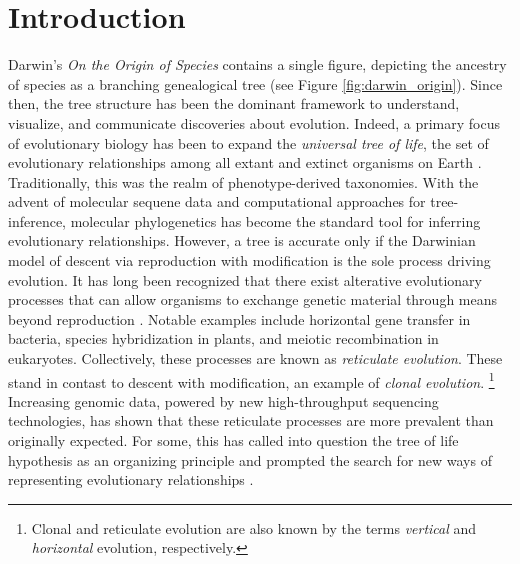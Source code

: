 \chapter{Introduction}
\label{ch:introduction}


Darwin's \emph{On the Origin of Species} contains a single figure, depicting the ancestry of species as a branching genealogical tree \cite{Darwin:1859uh} (see Figure \ref{fig:darwin_origin}).
Since then, the tree structure has been the dominant framework to understand, visualize, and communicate discoveries about evolution.
Indeed, a primary focus of evolutionary biology has been to expand the \emph{universal tree of life}, the set of evolutionary relationships among all extant and extinct organisms on Earth \cite{Bowler:2003uz}.
Traditionally, this was the realm of phenotype-derived taxonomies.
With the advent of molecular sequene data and computational approaches for tree-inference, molecular phylogenetics has become the standard tool for inferring evolutionary relationships.
However, a tree is accurate only if the Darwinian model of descent via reproduction with modification is the sole process driving evolution.
It has long been recognized that there exist alterative evolutionary processes that can allow organisms to exchange genetic material through means beyond reproduction \cite{Arnold:2007vq}.
Notable examples include horizontal gene transfer in bacteria, species hybridization in plants, and meiotic recombination in eukaryotes.
Collectively, these processes are known as \emph{reticulate evolution}.
These stand in contast to descent with modification, an example of \emph{clonal evolution}.
\footnote{Clonal and reticulate evolution are also known by the terms \emph{vertical} and \emph{horizontal} evolution, respectively.}
Increasing genomic data, powered by new high-throughput sequencing technologies, has shown that these reticulate processes are more prevalent than originally expected.
For some, this has called into question the tree of life hypothesis as an organizing principle and prompted the search for new ways of representing evolutionary relationships \cite{Doolittle:1999,OMalley:2011tu}.

